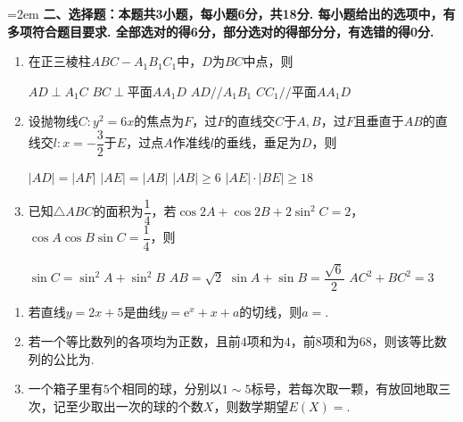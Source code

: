 \documentclass[12pt,a4paper]{article}
\providecommand{\varparallel}{\mathrel{/\!/}}
\begin{document}
	\noindent\hangindent=2em {\bfseries 二、选择题：本题共3小题，每小题6分，共18分. 每小题给出的选项中，有多项符合题目要求. 全部选对的得6分，部分选对的得部分分，有选错的得0分.}
	\begin{enumerate}[leftmargin=*,label=\arabic*.,resume,itemsep=0.8ex]
		\item 在正三棱柱$ABC-A_1B_1C_1$中，$D$为$BC$中点，则
		\begin{choicesFour}
			\choice $AD\perp A_1C$ \choice $BC\perp$平面$AA_1D$ \choice $AD\varparallel A_1B_1$ \choice $CC_1\varparallel$平面$AA_1D$
		\end{choicesFour}
		\item 设抛物线$C:y^2=6x$的焦点为$F$，过$F$的直线交$C$于$A,B$，过$F$且垂直于$AB$的直线交$l:x=-\dfrac32$于$E$，过点$A$作准线$l$的垂线，垂足为$D$，则
		\begin{choicesTwo}
			\choice $|AD|=|AF|$
			\choice $|AE|=|AB|$
			\choice $|AB|\ge6$
			\choice $|AE|\cdot|BE|\ge18$
		\end{choicesTwo}
		\item 已知$\triangle ABC$的面积为$\dfrac14$，若$\cos2A+\cos2B+2\sin^2C=2$，$\cos A\cos B\sin C=\dfrac14$，则
		\begin{choicesTwo}
			\choice $\sin C=\sin^2A+\sin^2B$
			\choice $AB=\sqrt2$
			\choice $\sin A+\sin B=\dfrac{\sqrt6}{2}$
			\choice $AC^2+BC^2=3$
		\end{choicesTwo}
	\end{enumerate}
	\vspace{0.3cm}
	\begin{enumerate}[leftmargin=*,label=\arabic*.,resume,itemsep=0.8ex]
		\item 若直线$y=2x+5$是曲线$y=\mathrm{e}^x+x+a$的切线，则$a=$\underline{\qquad\qquad}.
		\item 若一个等比数列的各项均为正数，且前$4$项和为$4$，前$8$项和为$68$，则该等比数列的公比为\underline{\qquad\qquad}.
		\item 一个箱子里有$5$个相同的球，分别以$1\sim5$标号，若每次取一颗，有放回地取三次，记至少取出一次的球的个数$X$，则数学期望$E(X)=$\underline{\qquad\qquad}.
	\end{enumerate}
	\vspace{0.3cm}
\end{document}
